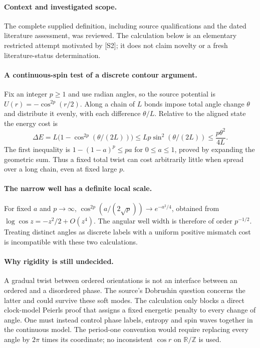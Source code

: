 \documentclass[11pt]{article}
\begin{document}
\paragraph{Context and investigated scope.} The complete supplied definition, including source qualifications and the dated literature assessment, was reviewed. The calculation below is an elementary restricted attempt motivated by [S2]; it does not claim novelty or a fresh literature-status determination.

\paragraph{A continuous-spin test of a discrete contour argument.} Fix an integer $p\geq1$ and use radian angles, so the source potential is $U(r)=-\cos^{2p}(r/2)$. Along a chain of $L$ bonds impose total angle change $\theta$ and distribute it evenly, with each difference $\theta/L$. Relative to the aligned state the energy cost is
\[
 \Delta E=L\bigl(1-\cos^{2p}(\theta/(2L))\bigr)
 \leq Lp\sin^2(\theta/(2L))\leq\frac{p\theta^2}{4L}.
\]
The first inequality is $1-(1-a)^p\leq pa$ for $0\leq a\leq1$, proved by expanding the geometric sum. Thus a fixed total twist can cost arbitrarily little when spread over a long chain, even at fixed large $p$.

\paragraph{The narrow well has a definite local scale.} For fixed $a$ and $p\to\infty$, $\cos^{2p}(a/(2\sqrt p))\to e^{-a^2/4}$, obtained from $\log\cos z=-z^2/2+O(z^4)$. The angular well width is therefore of order $p^{-1/2}$. Treating distinct angles as discrete labels with a uniform positive mismatch cost is incompatible with these two calculations.

\paragraph{Why rigidity is still undecided.} A gradual twist between ordered orientations is not an interface between an ordered and a disordered phase. The source's Dobrushin question concerns the latter and could survive these soft modes. The calculation only blocks a direct clock-model Peierls proof that assigns a fixed energetic penalty to every change of angle. One must instead control phase labels, entropy and spin waves together in the continuous model. The period-one convention would require replacing every angle by $2\pi$ times its coordinate; no inconsistent $\cos r$ on $\mathbb R/\mathbb Z$ is used.
\end{document}
